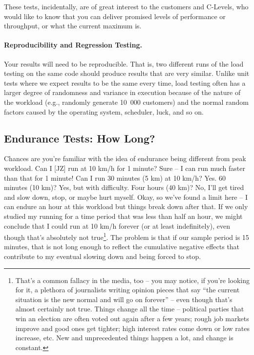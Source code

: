 These tests, incidentally, are of great interest to the customers and C-Levels, who would like to know that you can deliver promised levels of performance or throughput, or what the current maximum is.

\paragraph{Reproducibility and Regression Testing.}
Your results will need to be reproducible. That is, two different runs of the load testing on the same code should produce results that are very similar. Unlike unit tests where we expect results to be the same every time, load testing often has a larger degree of randomness and variance in execution because of the nature of the workload (e.g., randomly generate 10~000 customers) and the normal random factors caused by the operating system, scheduler, luck, and so on. 


\subsection*{Endurance Tests: How Long?}
Chances are you're familiar with the idea of endurance being different from peak workload. Can I [JZ] run at 10 km/h for 1 minute? Sure -- I can run much faster than that for 1 minute! Can I run 30 minutes (5 km) at 10 km/h? Yes. 60 minutes (10 km)? Yes, but with difficulty. Four hours (40 km)? No, I'll get tired and slow down, stop, or maybe hurt myself. Okay, so we've found a limit here -- I can endure an hour at this workload but things break down after that. If we only studied my running for a time period that was less than half an hour, we might conclude that I could run at 10 km/h forever (or at least indefinitely), even though that's absolutely not true\footnote{That's a common fallacy in the media, too -- you may notice, if you're looking for it, a plethora of journalists writing opinion pieces that say ``the current situation is the new normal and will go on forever'' -- even though that's almost certainly not true. Things change all the time -- political parties that win an election are often voted out again after a few years; rough job markets improve and good ones get tighter; high interest rates come down or low rates increase, etc. New and unprecedented things happen a lot, and change is constant.}. The problem is that if our sample period is 15 minutes, that is not long enough to reflect the cumulative negative effects that contribute to my eventual slowing down and being forced to stop. 

